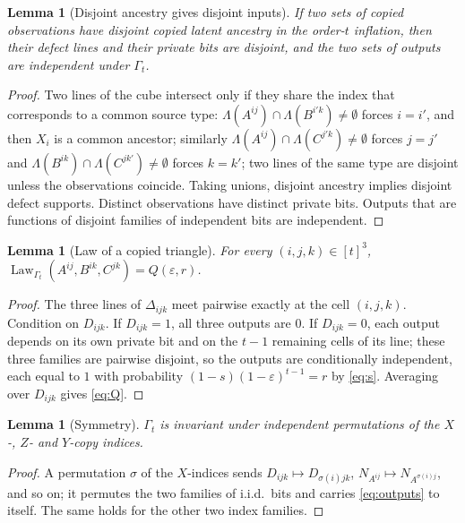 \documentclass[11pt]{article}
\theoremstyle{plain}
\newtheorem{lemma}[theorem]{Lemma}
\theoremstyle{definition}
\DeclareMathOperator{\Law}{Law}
\newcommand{\eps}{\varepsilon}
\begin{document}
\begin{lemma}[Disjoint ancestry gives disjoint inputs]\label{lem:disjoint}
If two sets of copied observations have disjoint copied latent ancestry in the order-$t$ inflation, then their defect lines and their private bits are disjoint, and the two sets of outputs are independent under $\Gamma_t$.
\end{lemma}
\begin{proof}
Two lines of the cube intersect only if they share the index that corresponds to a common source type: $\Lambda(A^{ij})\cap\Lambda(B^{i'k})\ne\emptyset$ forces $i=i'$, and then $X_i$ is a common ancestor; similarly $\Lambda(A^{ij})\cap\Lambda(C^{j'k})\ne\emptyset$ forces $j=j'$ and $\Lambda(B^{ik})\cap\Lambda(C^{jk'})\ne\emptyset$ forces $k=k'$; two lines of the same type are disjoint unless the observations coincide. Taking unions, disjoint ancestry implies disjoint defect supports. Distinct observations have distinct private bits. Outputs that are functions of disjoint families of independent bits are independent.
\end{proof}

\begin{lemma}[Law of a copied triangle]\label{lem:triangle-law}
For every $(i,j,k)\in[t]^3$, $\Law_{\Gamma_t}(A^{ij},B^{ik},C^{jk})=Q(\eps,r)$.
\end{lemma}
\begin{proof}
The three lines of $\Delta_{ijk}$ meet pairwise exactly at the cell $(i,j,k)$. Condition on $D_{ijk}$. If $D_{ijk}=1$, all three outputs are $0$. If $D_{ijk}=0$, each output depends on its own private bit and on the $t-1$ remaining cells of its line; these three families are pairwise disjoint, so the outputs are conditionally independent, each equal to $1$ with probability $(1-s)(1-\eps)^{t-1}=r$ by \eqref{eq:s}. Averaging over $D_{ijk}$ gives \eqref{eq:Q}.
\end{proof}

\begin{lemma}[Symmetry]\label{lem:symmetry}
$\Gamma_t$ is invariant under independent permutations of the $X$-, $Z$- and $Y$-copy indices.
\end{lemma}
\begin{proof}
A permutation $\sigma$ of the $X$-indices sends $D_{ijk}\mapsto D_{\sigma(i)jk}$, $N_{A^{ij}}\mapsto N_{A^{\sigma(i)j}}$, and so on; it permutes the two families of i.i.d.\ bits and carries \eqref{eq:outputs} to itself. The same holds for the other two index families.
\end{proof}
\end{document}
